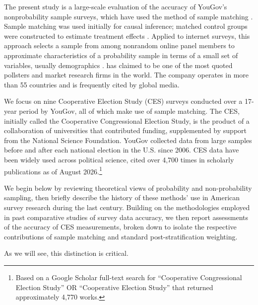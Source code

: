 \documentclass[12pt]{article}
\begin{document}
The present study is a large-scale evaluation of the
accuracy of YouGov’s nonprobability sample surveys, which have used the method
of sample matching \parencite{rivers_sampling_2007}. Sample matching was used initially for causal
inference; matched control groups were constructed
to estimate treatment effects \parencite{stuart_matching_2010}. Applied to internet surveys, this
approach selects a sample from among nonrandom online panel members to
approximate characteristics of a probability sample in terms of a small set of
variables, usually demographics \parencite{rivers_sample_2006}. \textcite{noauthor_yougov_nodate} has claimed to be
one of the most quoted pollsters and market research firms in the world. The company
operates in more than 55 countries and is frequently cited by global media.

We focus on nine Cooperative Election Study (CES) surveys conducted over a 17-year period by YouGov, all of which make use of sample matching. The CES, initially called the Cooperative Congressional Election Study, is the product of a collaboration of universities that contributed funding, supplemented by support from the National Science Foundation. YouGov collected data from large samples before and after each national election in the U.S. since 2006. CES data have been widely used across political science, cited over 4,700 times in scholarly publications as of August 2026.\footnote{Based on a Google Scholar full-text search for ``Cooperative Congressional Election Study'' OR ``Cooperative Election Study'' that returned approximately 4,770 works.}

We begin below by reviewing theoretical views of probability and non-probability sampling, then briefly describe the history of these methods’ use in American survey research during the last century. Building on the methodologies employed in past comparative studies of survey data accuracy, we then report assessments of the accuracy of CES measurements, broken down to isolate the respective contributions of sample matching and standard post-stratification weighting.

As we will see, this distinction is critical.

\end{document}
